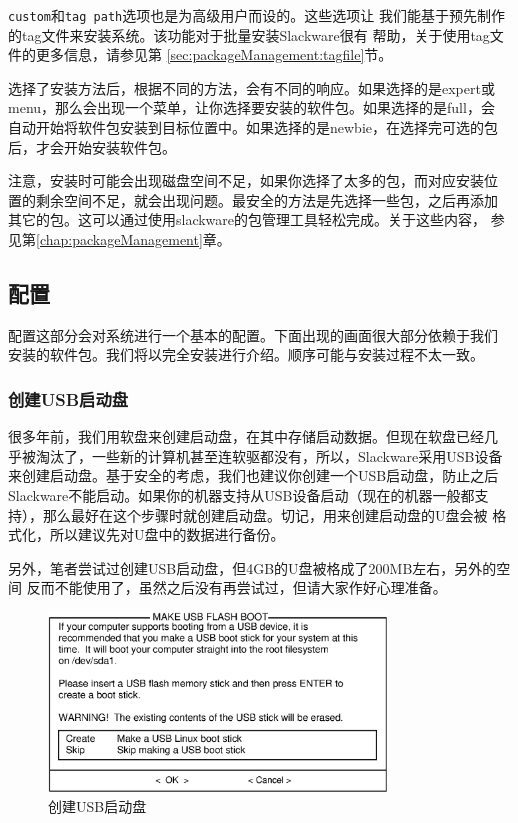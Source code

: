 \texttt{custom}和\texttt{tag path}选项也是为高级用户而设的。这些选项让
我们能基于预先制作的tag文件来安装系统。该功能对于批量安装Slackware很有
帮助，关于使用tag文件的更多信息，请参见第
\ref{sec:packageManagement:tagfile}节。

选择了安装方法后，根据不同的方法，会有不同的响应。如果选择的是expert或
menu，那么会出现一个菜单，让你选择要安装的软件包。如果选择的是full，会
自动开始将软件包安装到目标位置中。如果选择的是newbie，在选择完可选的包
后，才会开始安装软件包。

注意，安装时可能会出现磁盘空间不足，如果你选择了太多的包，而对应安装位
置的剩余空间不足，就会出现问题。最安全的方法是先选择一些包，之后再添加
其它的包。这可以通过使用slackware的包管理工具轻松完成。关于这些内容，
参见第\ref{chap:packageManagement}章。

\subsection{配置}
\label{sec:installation:setup:configure}

配置这部分会对系统进行一个基本的配置。下面出现的画面很大部分依赖于我们
安装的软件包。我们将以完全安装进行介绍。顺序可能与安装过程不太一致。
\subsubsection{创建USB启动盘}
\label{sec:installation:setup:configure:usbdisk}
很多年前，我们用软盘来创建启动盘，在其中存储启动数据。但现在软盘已经几
乎被淘汰了，一些新的计算机甚至连软驱都没有，所以，Slackware采用USB设备
来创建启动盘。基于安全的考虑，我们也建议你创建一个USB启动盘，防止之后
Slackware不能启动。如果你的机器支持从USB设备启动（现在的机器一般都支
持），那么最好在这个步骤时就创建启动盘。切记，用来创建启动盘的U盘会被
格式化，所以建议先对U盘中的数据进行备份。

另外，笔者尝试过创建USB启动盘，但4GB的U盘被格成了200MB左右，另外的空间
反而不能使用了，虽然之后没有再尝试过，但请大家作好心理准备。

\begin{figure}[htpb]
  \centering
  \includegraphics[width=0.8\textwidth]{images/installation/usb-boot-stick.eps}
  \caption{创建USB启动盘}
  \label{fig:usb-boot-stick}
\end{figure}

